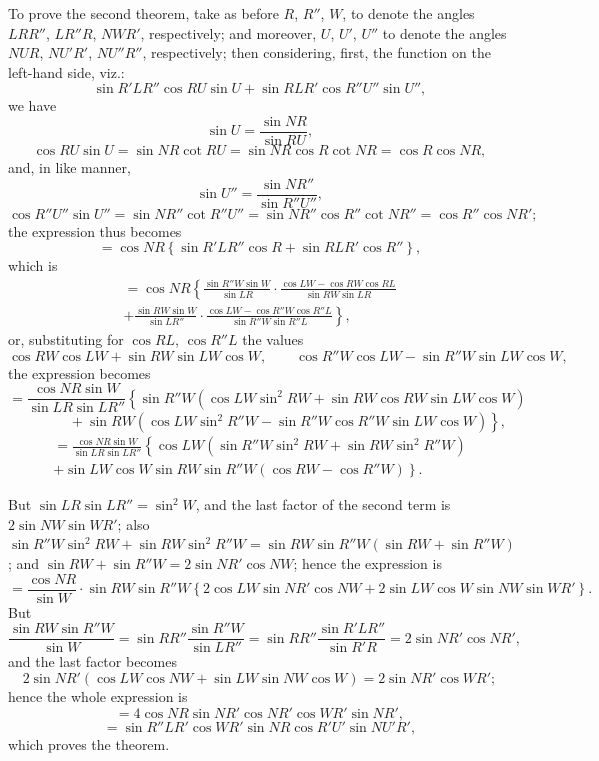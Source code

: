\documentclass[11pt,a4paper]{book}
\begin{document}
To prove the second theorem, take as before $R$, $R''$, $W$, to denote the angles $LRR''$, $LR''R$, $NWR'$, respectively; and moreover, $U$, $U'$, $U''$ to denote the angles $NUR$, $NU'R'$, $NU''R''$, respectively; then considering, first, the function on the left-hand side, viz.:
\[
\sin R'LR''\cos RU\sin U+\sin RLR'\cos R''U''\sin U'',
\]
we have
\[
\sin U=\frac{\sin NR}{\sin RU},
\]
\[
\cos RU\sin U=\sin NR\cot RU=\sin NR\cos R\cot NR=\cos R\cos NR,
\]
and, in like manner,
\[
\sin U''=\frac{\sin NR''}{\sin R''U''},
\]
\[
\cos R''U''\sin U''=\sin NR''\cot R''U''=\sin NR''\cos R''\cot NR''=\cos R''\cos NR';
\]
the expression thus becomes
\[
=\cos NR\left\{\sin R'LR''\cos R+\sin RLR'\cos R''\right\},
\]
which is
\begin{multline*}
=\cos NR\left\{\frac{\sin R''W\sin W}{\sin LR}\cdot\frac{\cos LW-\cos RW\cos RL}{\sin RW\sin LR}\right.\\
\left.+\frac{\sin RW\sin W}{\sin LR''}\cdot\frac{\cos LW-\cos R''W\cos R''L}{\sin R''W\sin R''L}\right\},
\end{multline*}
or, substituting for $\cos RL$, $\cos R''L$ the values
\[
\cos RW\cos LW+\sin RW\sin LW\cos W,\qquad
\cos R''W\cos LW-\sin R''W\sin LW\cos W,
\]
the expression becomes
\[
=\frac{\cos NR\sin W}{\sin LR\sin LR''}
\left\{\sin R''W(\cos LW\sin^2RW+\sin RW\cos RW\sin LW\cos W)\right.
\]
\[
\left.\qquad\qquad+\sin RW(\cos LW\sin^2R''W-\sin R''W\cos R''W\sin LW\cos W)\right\},
\]
\begin{multline*}
=\frac{\cos NR\sin W}{\sin LR\sin LR''}
\left\{\cos LW(\sin R''W\sin^2RW+\sin RW\sin^2R''W)\right.\\
\left.+\sin LW\cos W\sin RW\sin R''W(\cos RW-\cos R''W)\right\}.
\end{multline*}

But $\sin LR\sin LR''=\sin^2W$, and the last factor of the second term is $2\sin NW\sin WR'$; also $\sin R''W\sin^2RW+\sin RW\sin^2R''W=\sin RW\sin R''W(\sin RW+\sin R''W)$; and $\sin RW+\sin R''W=2\sin NR'\cos NW$; hence the expression is
\[
=\frac{\cos NR}{\sin W}
\cdot\sin RW\sin R''W
\left\{2\cos LW\sin NR'\cos NW+2\sin LW\cos W\sin NW\sin WR'\right\}.
\]
But
\[
\frac{\sin RW\sin R''W}{\sin W}=\sin RR''\frac{\sin R''W}{\sin LR''}=\sin RR''\frac{\sin R'LR''}{\sin R'R}=2\sin NR'\cos NR',
\]
and the last factor becomes
\[
2\sin NR'(\cos LW\cos NW+\sin LW\sin NW\cos W)=2\sin NR'\cos WR';
\]
hence the whole expression is
\[
=4\cos NR\sin NR'\cos NR'\cos WR'\sin NR',
\]
\[
=\sin R''LR'\cos WR'\sin NR\cos R'U'\sin NU'R',
\]
which proves the theorem.
\end{document}
